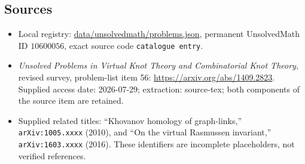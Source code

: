 \documentclass[11pt]{article}
\begin{document}
\subsection{Sources}
\begin{itemize}
\item Local registry: \url{data/unsolvedmath/problems.json}, permanent UnsolvedMath ID $10600056$, exact source code \texttt{catalogue entry}.
\item \emph{Unsolved Problems in Virtual Knot Theory and Combinatorial Knot Theory}, revised survey, problem-list item 56: \url{https://arxiv.org/abs/1409.2823}. Supplied access date: 2026-07-29; extraction: source-tex; both components of the source item are retained.
\item Supplied related titles: ``Khovanov homology of graph-links,'' \texttt{arXiv:1005.xxxx} (2010), and ``On the virtual Rasmussen invariant,'' \texttt{arXiv:1603.xxxx} (2016). These identifiers are incomplete placeholders, not verified references.
\end{itemize}
\end{document}

